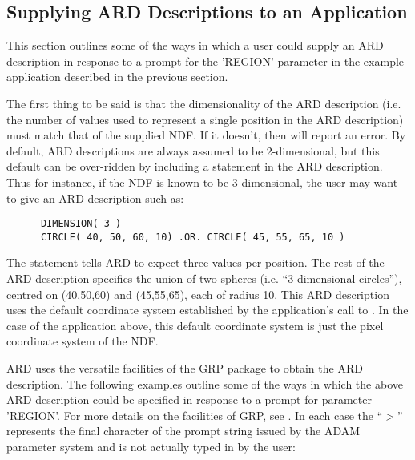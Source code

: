 \subsection{Supplying ARD Descriptions to an Application}
This section outlines some of the ways in which a user could supply an ARD
description in response to a prompt for the 'REGION' parameter in the example
application described in the previous section. 

The first thing to be said is that the dimensionality of the ARD description
(i.e. the number of values used to represent a single position in the ARD
description) must match that of the supplied NDF. If it
doesn't, then  will report an error. By default, ARD descriptions are
always assumed to be 2-dimensional, but this default can be over-ridden by
including a  statement in the ARD description. Thus for instance, if 
the NDF is known to be 3-dimensional, the user may want to give an ARD 
description such as:

\small
\begin{verbatim}
      DIMENSION( 3 )
      CIRCLE( 40, 50, 60, 10) .OR. CIRCLE( 45, 55, 65, 10 ) 
\end{verbatim}
\normalsize

The  statement tells ARD to expect three values per position. The rest
of the ARD description specifies the union of two spheres (i.e. ``3-dimensional
circles''), centred on (40,50,60) and (45,55,65), each of radius 10. This ARD
description uses the default coordinate system established by the application's
call to . In the case of the application above, this default
coordinate system is just the pixel coordinate system of the NDF. 

ARD uses the versatile facilities of the GRP package to obtain the ARD
description. The following examples outline some of the ways in which the above
ARD description could be specified in response to a prompt for parameter
'REGION'. For more details on the facilities of GRP, see . In each case
the ``$>$'' represents the final character of the prompt string issued by the
ADAM parameter system and is not actually typed in by the user: 

